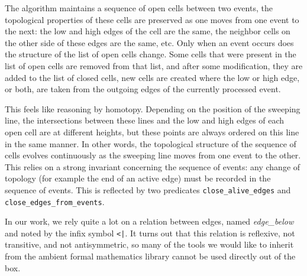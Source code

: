 \documentclass[a4paper, USenglish, cleveref, autoref, thm-restate]{lipics-v2021}
\begin{document}
The algorithm maintains a sequence of open cells between two events,
the topological properties of these cells are preserved as one moves
from one event to the next: the low and high edges of the cell are the
same, the neighbor cells on the other side of these edges are the
same, etc.  Only when an event occurs does the structure of the list
of open cells change.  Some cells that were present in the list of
open cells are removed from that list, and after some modification,
they are added to the list of closed cells, new cells are created
where the low or high edge, or both, are taken from the outgoing edges
of the currently processed event.

This feels like reasoning by homotopy.  Depending on the position of
the sweeping line, the intersections between these lines and the low
and high edges of each open cell are at different heights, but these
points are always ordered on this line in the same manner.  In other
words, the topological structure of the sequence of cells evolves
continuously as the sweeping line moves from one event to the other.
This relies on a strong invariant concerning the sequence of events:
any change of topology (for example the end of an active edge) must be
recorded in the sequence of events.  This is reflected by two
predicates {\tt close\_alive\_edges} and {\tt close\_edges\_from\_events}.

In our work, we rely quite a lot on a relation between edges, named
{\em edge\_below} and noted by the infix symbol {\tt <|}.  It turns
out that this relation is reflexive, not transitive, and not
antisymmetric, so many of the tools we
would like to inherit from the ambient formal mathematics library
cannot be used directly out of the box.
\end{document}
